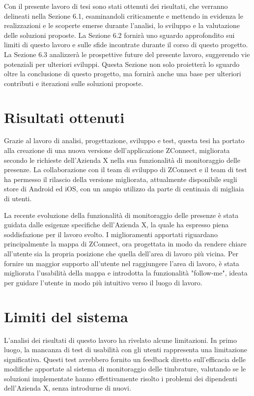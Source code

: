Con il presente lavoro di tesi sono stati ottenuti dei risultati, che verranno delineati nella Sezione 6.1, esaminandoli criticamente e mettendo in evidenza le realizzazioni e le scoperte emerse durante l'analisi, lo sviluppo e la valutazione delle soluzioni proposte. La Sezione 6.2 fornirà uno sguardo approfondito sui limiti di questo lavoro e sulle sfide incontrate durante il corso di questo progetto. La Sezione 6.3 analizzerà le prospettive future del presente lavoro, suggerendo vie potenziali per ulteriori sviluppi. Questa Sezione non solo proietterà lo sguardo oltre la conclusione di questo progetto, ma fornirà anche una base per ulteriori contributi e iterazioni sulle soluzioni proposte.

\section{Risultati ottenuti}
Grazie al lavoro di analisi, progettazione, sviluppo e test, questa tesi ha portato alla creazione di una nuova versione dell'applicazione ZConnect, migliorata secondo le richieste dell'Azienda X nella sua funzionalità di monitoraggio delle presenze. La collaborazione con il team di sviluppo di ZConnect e il team di test ha permesso il rilascio della versione migliorata, attualmente disponibile sugli store di Android ed iOS, con un ampio utilizzo da parte di centinaia di migliaia di utenti.

La recente evoluzione della funzionalità di monitoraggio delle presenze è stata guidata dalle esigenze specifiche dell'Azienda X, la quale ha espresso piena soddisfazione per il lavoro svolto. I miglioramenti apportati riguardano principalmente la mappa di ZConnect, ora progettata in modo da rendere chiare all'utente sia la propria posizione che quella dell'area di lavoro più vicina. Per fornire un maggior supporto all'utente nel raggiungere l'area di lavoro, è stata migliorata l'usabilità della mappa e introdotta la funzionalità "follow-me", ideata per guidare l'utente in modo più intuitivo verso il luogo di lavoro.

\section{Limiti del sistema}
L'analisi dei risultati di questo lavoro ha rivelato alcune limitazioni.
In primo luogo, la mancanza di test di usabilità con gli utenti rappresenta una limitazione significativa. Questi test avrebbero fornito un feedback diretto sull'efficacia delle modifiche apportate al sistema di monitoraggio delle timbrature, valutando se le soluzioni implementate hanno effettivamente risolto i problemi dei dipendenti dell'Azienda X, senza introdurne di nuovi.

